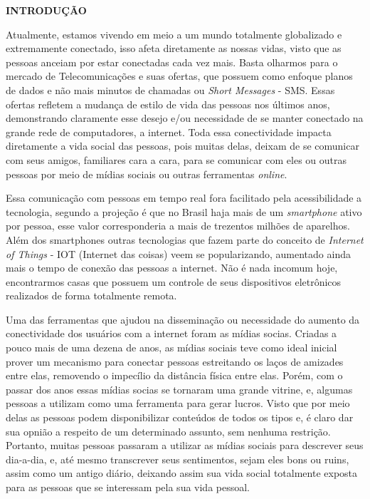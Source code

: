 \begin{flushleft}
	\vspace{1.2em}
	\textbf{\large INTRODUÇÃO}
	\vspace{2.9em}
\end{flushleft}
\thispagestyle{empty}


Atualmente, estamos vivendo em meio a um mundo totalmente globalizado e extremamente conectado, isso afeta diretamente as nossas vidas, visto que as pessoas
anceiam por estar conectadas cada vez mais. Basta olharmos para o mercado de Telecomunicações e suas ofertas, que possuem como enfoque planos de dados e não mais
minutos de chamadas ou \textit{Short Messages} - SMS. Essas ofertas refletem a mudança de estilo de vida das pessoas nos últimos anos, demonstrando claramente
esse desejo e/ou necessidade de se manter conectado na grande rede de computadores, a internet. Toda essa conectividade impacta diretamente a vida social
das pessoas, pois muitas delas, deixam de se comunicar com seus amigos, familiares cara a cara, para se comunicar com eles ou outras pessoas por meio de mídias
sociais ou outras ferramentas \textit{online}.

Essa comunicação com pessoas em tempo real fora facilitado pela acessibilidade a tecnologia, segundo  a projeção é que no Brasil haja mais de um \textit{smartphone} ativo por pessoa, esse valor corresponderia a mais de trezentos milhões de aparelhos. Além dos smartphones outras tecnologias que fazem parte do conceito de \textit{Internet of Things} - IOT (Internet das coisas)
veem se popularizando, aumentado ainda mais o tempo de conexão das pessoas a internet. Não é nada incomum hoje, encontrarmos casas que possuem um controle de seus
dispositivos eletrônicos realizados de forma totalmente remota.

Uma das ferramentas que ajudou na disseminação ou necessidade do aumento da conectividade dos usuários com a internet foram as mídias socias. Criadas a pouco mais de uma dezena de anos, as mídias sociais teve como ideal inicial prover um mecanismo para conectar pessoas estreitando os laços de amizades entre elas, removendo o impecílio da distância física entre elas. Porém, com o passar dos anos essas mídias socias se tornaram uma grande vitrine, e, algumas pessoas a utilizam como uma
ferramenta para gerar lucros. Visto que por meio delas as pessoas podem disponibilizar conteúdos de todos os tipos e, é claro dar sua opnião a respeito de um determinado assunto, sem nenhuma restrição. Portanto, muitas pessoas passaram a utilizar as mídias sociais para descrever seus dia-a-dia, e, até mesmo transcrever seus sentimentos, sejam eles bons ou ruins, assim como um antigo diário, deixando assim sua vida social totalmente exposta para as pessoas que se interessam pela sua vida pessoal. 

